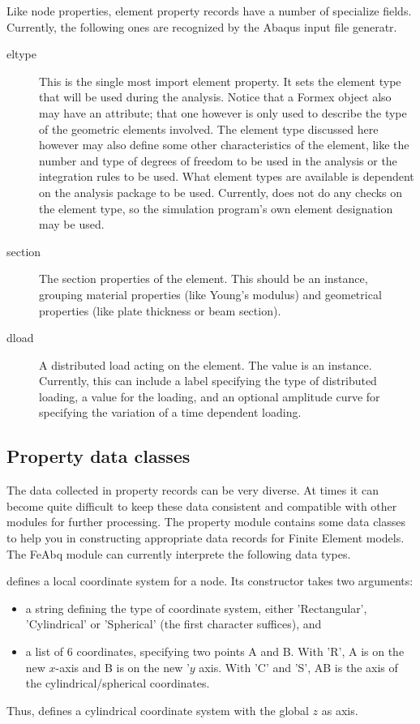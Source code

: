 {{{Like node properties, element property records have a number of specialize fields. Currently, the following ones are recognized by the Abaqus input file generatr.
\begin{description}
 \item [eltype] This is the single most import element property. It sets the element type that will be used during the analysis. Notice that a Formex object also may have an  attribute; that one however is only used to describe the type of the geometric elements involved. The element type discussed here however may also define some other characteristics of the element, like the number and type of degrees of freedom to be used in the analysis or the integration rules to be used. What element types are available is dependent on the analysis package to be used. Currently, \pyf does not do any checks on the element type, so the simulation program's own element designation may be used.
 \item[section] The section properties of the element. This should be an  instance, grouping material properties (like Young's modulus) and geometrical properties (like plate thickness or beam section).
 \item[dload] A distributed load acting on the element. The value is an  instance. Currently, this can include a label specifying the type of distributed loading, a value for the loading, and an optional amplitude curve for specifying the variation of a time dependent loading.  
\end{description}


\subsection{Property data classes}
The data collected in property records can be very diverse. At times it can become quite difficult to keep these data consistent and compatible with other modules for further processing.
The property module contains some data classes to help you in constructing appropriate data records for Finite Element models. The FeAbq module can currently interprete the following data types.

 defines a local coordinate system for a node. Its constructor takes two arguments: 
\begin{itemize}
\item a string defining the type of coordinate system, either 'Rectangular', 'Cylindrical' or 'Spherical' (the first character suffices), and
\item a list of 6 coordinates, specifying two points A and B. With 'R', A is on the new $x$-axis and B is on the new '$y$ axis. With 'C' and 'S', AB is the axis of the cylindrical/spherical coordinates.
\end{itemize}
Thus,  defines a cylindrical coordinate system with the global $z$ as axis.

}}}
